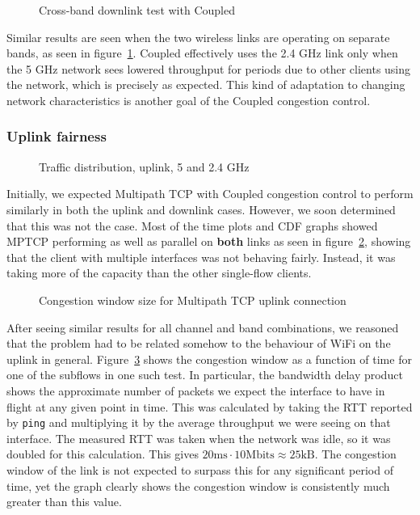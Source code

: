\begin{figure}[h]
 \centering
 
 \caption{Cross-band downlink test with Coupled}\label{graph:cb-fairness-down}
\end{figure}

Similar results are seen when the two wireless links are operating on separate
bands, as seen in figure~\ref{graph:cb-fairness-down}. Coupled effectively uses
the 2.4 GHz link only when the 5 GHz network sees lowered throughput for periods
due to other clients using the network, which is precisely as expected. This
kind of adaptation to changing network characteristics is another goal of the
Coupled congestion control.

\subsubsection{Uplink fairness}

\begin{figure}[h]
 \centering
 
 \caption{Traffic distribution, uplink, 5 and 2.4 GHz}\label{graph:up-fair}
\end{figure}

Initially, we expected Multipath TCP with Coupled congestion control to perform
similarly in both the uplink and downlink cases. However, we soon determined
that this was not the case. Most of the time plots and CDF graphs showed MPTCP
performing as well as parallel on \textbf{both} links as seen in
figure~\ref{graph:up-fair}, showing that the client with multiple interfaces was
not behaving fairly. Instead, it was taking more of the capacity than the other
single-flow clients.

\begin{figure}[h]
 \centering
 
 \caption{Congestion window size for Multipath TCP uplink connection}\label{graph:fairness-up-close}
\end{figure}

After seeing similar results for all channel and band combinations, we reasoned
that the problem had to be related somehow to the behaviour of WiFi on the
uplink in general. Figure~\ref{graph:fairness-up-close} shows the congestion
window as a function of time for one of the subflows in one such test. In
particular, the bandwidth delay product shows the approximate number of packets
we expect the interface to have in flight at any given point in time. This was
calculated by taking the RTT reported by \texttt{ping} and multiplying it by the
average throughput we were seeing on that interface. The measured RTT was taken
when the network was idle, so it was doubled for this calculation. This gives
$20\text{ms} \cdot 10\text{Mbits} \approx 25\text{kB}$. The congestion window of
the link is not expected to surpass this for any significant period of time, yet
the graph clearly shows the congestion window is consistently much greater than
this value.

